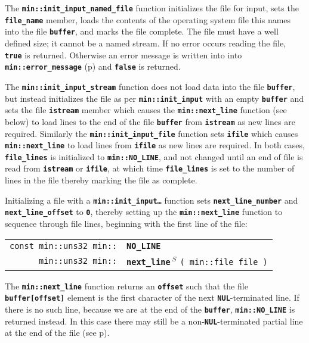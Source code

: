 \documentclass[12pt]{article}
\makeatletter
\newcommand{\TT}[1]{{\tt \bfseries #1}}
\newcommand{\ttindex}[1]{\index{#1@{\tt #1}}}
\newcommand{\pagref}[1]{p\pageref{#1}}
\newcommand{\EOL}{\penalty \exhyphenpenalty}
\newenvironment{indpar}[1][0.3in]%
	{\begin{list}{}%
		     {\setlength{\itemsep}{0in}%
		      \setlength{\topsep}{0in}%
		      \setlength{\parsep}{1ex}%
		      \setlength{\labelwidth}{#1}%
		      \setlength{\leftmargin}{#1}%
		      \addtolength{\leftmargin}{\labelsep}}%
	 \item}%
	{\end{list}}
\newcommand{\LABEL}[1]{\label{#1}}
\newcommand{\MINKEY}[1]%
	   {\TT{#1}\ttindex{min::#1}\ttindex{#1}}
\newcommand{\RESIZE}{$\,^S$}
\makeatother
\begin{document}
The \TT{min::init\_input\_named\_file} function
initializes the file for input,
sets the \TT{file\_\EOL name} member,
loads the contents of the operating system file this names into the
file \TT{buffer}, and marks the file complete.
The file must have a well defined size; it cannot be a named stream.
If no error occurs reading the file, \TT{true}
is returned.  Otherwise an error message is written into
into \TT{min::\EOL error\_\EOL message}
(\pagref{ERROR_MESSAGE}) and \TT{false} is returned.

The \TT{min::init\_input\_stream} function does not load data into
the file \TT{buffer}, but instead initializes the file as per
\TT{min::init\_input} with an empty \TT{buffer}
and sets the file \TT{istream} member
which causes the \TT{min::\EOL next\_\EOL line} function (see below)
to load lines to the end of
the file \TT{buffer}
from \TT{istream} as new lines are required.  Similarly
the \TT{min::\EOL init\_\EOL input\_\EOL file} function sets
\TT{ifile} which causes \TT{min::\EOL next\_\EOL line} to load lines
from \TT{ifile} as new lines are required.
In both cases, \TT{file\_lines} is initialized
to \TT{min::\EOL NO\_\EOL LINE}, and not changed until
an end of file is read from \TT{istream} or \TT{ifile}, at which time
\TT{file\_\EOL lines} is set to the number of lines in the file
thereby marking the file as complete.

Initializing a file with a \TT{min::\EOL init\_\EOL input\ldots} function
sets \TT{next\_\EOL line\_\EOL number}
and \TT{next\_\EOL line\_\EOL offset} to \TT{0}, thereby
setting up the \TT{min::\EOL next\_\EOL line} function to
sequence through file lines, beginning with the first line of the file:

\begin{indpar}[1em]\begin{tabular}{r@{}l}
\verb|const min::uns32 min::| & \MINKEY{NO\_LINE}
\LABEL{MIN::NO_LINE} \\
\verb|min::uns32 min::|
    & \MINKEY{next\_line\RESIZE} \verb|( min::file file )|
\LABEL{MIN::NEXT_LINE_OF_FILE} \\
\end{tabular}\end{indpar}

The \TT{min::\EOL next\_\EOL line} function returns an
\TT{offset} such that the file \TT{buffer[offset]} element
is the first character of the next \TT{NUL}-terminated line.
If there is no such line, because we are at the end of the \TT{buffer},
\TT{min::\EOL NO\_\EOL LINE} is returned instead.  In this case
there may still be a non-\TT{NUL}-terminated partial line at the end
of the file (see \pagref{PARTIAL-LINE}).
\end{document}
